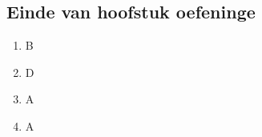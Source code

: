 \subsection{Einde van hoofstuk oefeninge}
\begin{multicols}{3}
 \begin{enumerate}[noitemsep, label=\textbf{(\arabic*)} ]
  \item B
\item D
  \item A
\item A
 \end{enumerate}
\end{multicols}

